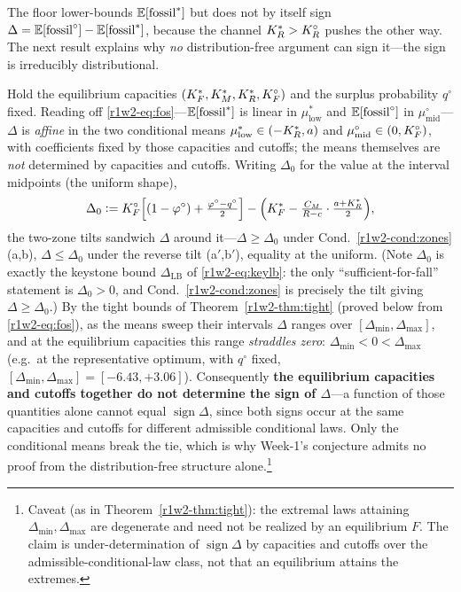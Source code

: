 The floor lower-bounds $\mathbb{E}[\text{fossil}^{*}]$ but does not by itself sign
$\Delta=\mathbb{E}[\text{fossil}^{\circ}]-\mathbb{E}[\text{fossil}^{*}]$, because the channel
$K_R^{*}>K_R^{\circ}$ pushes the other way. The next result explains why \emph{no}
distribution-free argument can sign it---the sign is irreducibly distributional.

\begin{proposition}\label{r1w2-prop:irreducible}
Hold the equilibrium capacities $(K_F^{*},K_M^{*},K_R^{*},K_F^{\circ})$ and the surplus probability
$q^{\circ}$ fixed. Reading off \eqref{r1w2-eq:fos}---$\mathbb{E}[\text{fossil}^{*}]$ is linear in
$\mu^{*}_{\mathrm{low}}$ and $\mathbb{E}[\text{fossil}^{\circ}]$ in
$\mu^{\circ}_{\mathrm{mid}}$---$\Delta$ is \emph{affine} in the two conditional means
$\mu^{*}_{\mathrm{low}}\in(-K_R^{*},a)$ and $\mu^{\circ}_{\mathrm{mid}}\in(0,K_F^{\circ})$,
with coefficients fixed by those capacities and cutoffs; the means themselves are
\emph{not} determined by capacities and cutoffs. Writing $\Delta_0$ for the value at
the interval midpoints (the uniform shape),
\begin{equation}\label{r1w2-eq:D0}
  \Delta_0\vcentcolon=K_F^{\circ}\Big[(1-\varphi^{\circ})+\tfrac{\varphi^{\circ}-q^{\circ}}{2}\Big]
  -\Big(K_F^{*}-\tfrac{C_M}{R-c}\cdot\tfrac{a+K_R^{*}}{2}\Big),
\end{equation}
the two-zone tilts sandwich $\Delta$ around it---$\Delta\ge\Delta_0$ under
Cond.~\ref{r1w2-cond:zones}(a,b), $\Delta\le\Delta_0$ under the reverse tilt
(a$'$,b$'$), equality at the uniform. (Note $\Delta_0$ is exactly the keystone bound
$\Delta_{\mathrm{LB}}$ of \eqref{r1w2-eq:keylb}: the only ``sufficient-for-fall''
statement is $\Delta_0>0$, and Cond.~\ref{r1w2-cond:zones} is precisely the tilt giving
$\Delta\ge\Delta_0$.) By the tight bounds of Theorem~\ref{r1w2-thm:tight} (proved below
from \eqref{r1w2-eq:fos}), as the means sweep their
intervals $\Delta$ ranges over $[\Delta_{\min},\Delta_{\max}]$, and at the
equilibrium capacities this range \emph{straddles zero}: $\Delta_{\min}<0<\Delta_{\max}$
(e.g.\ at the representative optimum, with $q^{\circ}$ fixed,
$[\Delta_{\min},\Delta_{\max}]=[-6.43,+3.06]$).
Consequently \textbf{the equilibrium capacities and cutoffs together do not
determine the sign of $\Delta$}---a function of those quantities alone cannot equal
$\operatorname{sign}\Delta$, since both signs occur at the same capacities and
cutoffs for different admissible conditional laws. Only the conditional means break
the tie, which is why Week-1's conjecture admits no proof from the distribution-free
structure alone.\footnote{Caveat (as in Theorem~\ref{r1w2-thm:tight}): the extremal laws
attaining $\Delta_{\min},\Delta_{\max}$ are degenerate and need not be realized by
an equilibrium $F$. The claim is under-determination of $\operatorname{sign}\Delta$
by capacities and cutoffs over the admissible-conditional-law class, not that an
equilibrium attains the extremes.}
\end{proposition}
